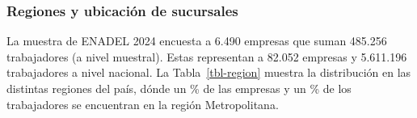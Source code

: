 \documentclass[
  11pt,
]{article}
\begin{document}
\FloatBarrier

\subsubsection{Regiones y ubicación de
sucursales}\label{regiones-y-ubicaciuxf3n-de-sucursales}

La muestra de ENADEL 2024 encuesta a 6.490 empresas que suman 485.256
trabajadores (a nivel muestral). Estas representan a 82.052 empresas y
5.611.196 trabajadores a nivel nacional. La Tabla~\ref{tbl-region}
muestra la distribución en las distintas regiones del país, dónde un
\% de las empresas y un \% de los trabajadores se
encuentran en la región Metropolitana.

\vspace{5mm}

\FloatBarrier

\begin{table}

\caption{\label{tbl-region}Resultados de la encuesta}


\end{table}%
\end{document}

